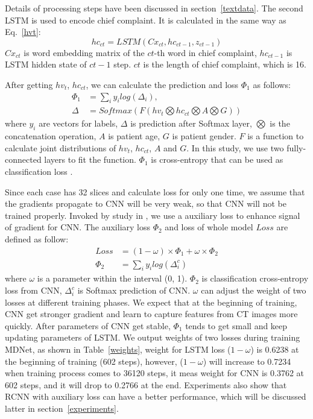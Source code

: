 \documentclass[journal]{IEEEtran}
\begin{document}
Details of processing steps have been discussed in section~\ref{textdata}. The second LSTM is used to encode chief complaint. It is calculated in the same way as Eq.~\ref{hvt}:
\begin{equation}
    hc_{ct} = LSTM(Cx_{ct}, hc_{ct-1}, z_{ct-1})
    \label{hct}
\end{equation}
$Cx_{ct}$ is word embedding matrix of the $ct$-th word in chief complaint, $hc_{ct-1}$ is LSTM hidden state of $ct-1$ step. $ct$ is the length of chief complaint, which is 16. 

After getting $hv_t$, $hc_{ct}$, we can calculate the prediction and loss $\Phi_1$ as follows:
\begin{align*}\label{classifyandloss1}
    \Phi_1 &= \sum_i{y_i log(\Delta_i)}, \\
    \Delta &= Softmax(F(hv_t \bigotimes hc_{ct} \bigotimes A \bigotimes G))
\end{align*}
where $y_i$ are vectors for labels, $\Delta$ is prediction after Softmax layer, $\bigotimes$ is the concatenation operation, $A$ is patient age, $G$ is patient gender. $F$ is a function to calculate joint distributions of $hv_t$, $hc_{ct}$, $A$ and $G$. In this study, we use two fully-connected layers to fit the function. $\Phi_1$ is cross-entropy that can be used as classification loss \cite{Zreik2018A}.

Since each case has 32 slices and calculate loss for only one time, we assume that the gradients propagate to CNN will be very weak, so that CNN will not be trained properly. Invoked by study in \cite{szegedy2016rethinking}, we use a auxiliary loss to enhance signal of gradient for CNN.
The auxiliary loss $\Phi_2$ and loss of whole model $Loss$ are defined as follow: 
\begin{align*}
Loss &=  (1 - \omega) \times \Phi_1 +  \omega \times \Phi_2 \\
\Phi_2 &= \sum_i{y_i log(\Delta^c_i)}
\end{align*}
where $\omega$ is a parameter within the interval (0, 1). $\Phi_2$ is classification cross-entropy loss from CNN, $\Delta^c_i$ is Softmax prediction of CNN. $\omega$ can adjust the weight of two losses at different training phases.
We expect that at the beginning of training, CNN get stronger gradient and learn to capture features from CT images more quickly. After parameters of CNN get stable, $\Phi_1$ tends to get small and keep updating parameters of LSTM. We output weights of two losses during training MDNet, as shown in Table~\ref{weights}, weight for LSTM loss ($1 - \omega$) is 0.6238 at the beginning of training (602 steps), however, ($1 - \omega$) will increase to 0.7234 when training process comes to 36120 steps, it meas weight for CNN is 0.3762 at 602 steps, and it will drop to 0.2766 at the end. Experiments also show that RCNN with auxiliary loss can have a better performance, which will be discussed latter in section~\ref{experiments}.
\end{document}
